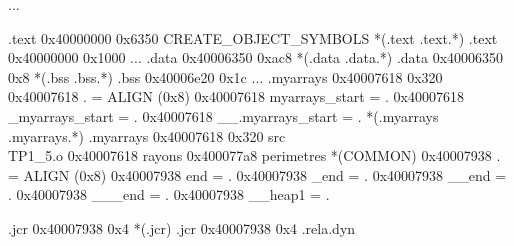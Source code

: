 \documentclass[12pt,a4paper]{article}
\begin{document}
\begin{framed}
...\newline
 {\selectfont
.text           0x40000000     0x6350\newline
 CREATE\_OBJECT\_SYMBOLS\newline
 *(.text .text.*)\newline
 .text          0x40000000     0x1000\newline 
 ...\newline
 .data           0x40006350      0xac8\newline
 *(.data .data.*)\newline
 .data          0x40006350        0x8\newline 
 *(.bss .bss.*)\newline
 .bss           0x40006e20       0x1c\newline 
 ...\newline
 .myarrays       0x40007618      0x320\newline
                0x40007618                . = ALIGN (0x8)\newline
                0x40007618                myarrays\_start = .\newline
                0x40007618                \_myarrays\_start = .\newline
                0x40007618                \_\_.myarrays\_start = .\newline
 *(.myarrays .myarrays.*)\newline
 .myarrays      0x40007618      0x320 src\\TP1\_5.o\newline
 \color{red}
                0x40007618                rayons\newline
                0x400077a8                perimetres\newline
   \color{black}             
 *(COMMON)
                0x40007938                . = ALIGN (0x8)\newline
                0x40007938                end = .\newline
                0x40007938                \_end = .\newline
                0x40007938                \_\_end = .\newline
                0x40007938                \_\_\_end = .\newline
                0x40007938                \_\_heap1 = .\newline

.jcr            0x40007938        0x4\newline
 *(.jcr)
 .jcr           0x40007938        0x4\newline 
.rela.dyn\newline

}
\end{framed}
\end{document}
